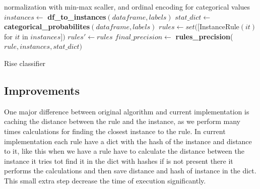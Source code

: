\documentclass{article}
\begin{document}
\begin{algorithm}[h!]
    \setlength{\algomargin}{0.5cm}
    
    \BlankLine
    
    normalization with min-max scaller, and ordinal encoding for categorical values\;
    $instances \gets$ \textbf{df\_to\_instances}$(dataframe,labels)$\;
    $stat\_dict \gets $ \textbf{categorical\_probabilites}$(dataframe,labels)$\;
    $rules \gets set([$InstanceRule$(it) $  for  $  it  $ in $ instances])$ \;
    $rules' \gets rules$\;
    $final\_precision \gets $ \textbf{rules\_precision}($rule,instances,stat\_dict)$\;
    \caption{Rise classifier}
    \label{rise_alg}
\end{algorithm}

\subsection{Improvements}
One major difference between original algorithm and current implementation is caching  the distance between the rule
and the instance, as we perform many times calculations for finding the closest instance to the rule. In current implementation
each rule have a dict with the hash of the instance and distance to it, like this when we have a rule have to calculate the distance
between the instance it tries tot find it in the dict with hashes if is not present there it performs the calculations 
and then save distance and hash of instance in the dict. This small extra step decrease the time of execution significantly.
\end{document}
